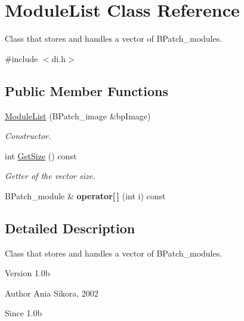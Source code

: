 \hypertarget{class_module_list}{\section{Module\-List Class Reference}
\label{class_module_list}
}


Class that stores and handles a vector of B\-Patch\-\_\-modules.  




{\ttfamily \#include $<$di.\-h$>$}

\subsection*{Public Member Functions}
\begin{DoxyCompactItemize}
\item 
\hyperlink{class_module_list_a184b4e31f6e1df914701a43055215a88}{Module\-List} (B\-Patch\-\_\-image \&bp\-Image)
\begin{DoxyCompactList}\small\item\em Constructor. \end{DoxyCompactList}\item 
int \hyperlink{class_module_list_a30e1ca8e40ebc1ce371fa6925031c6c8}{Get\-Size} () const 
\begin{DoxyCompactList}\small\item\em Getter of the vector size. \end{DoxyCompactList}\item 
\hypertarget{class_module_list_a5c0f811ee4768944e73bc024e0e97588}{B\-Patch\-\_\-module \& {\bfseries operator\mbox{[}$\,$\mbox{]}} (int i) const }\label{class_module_list_a5c0f811ee4768944e73bc024e0e97588}

\end{DoxyCompactItemize}


\subsection{Detailed Description}
Class that stores and handles a vector of B\-Patch\-\_\-modules. 

\begin{DoxyVersion}{Version}
1.\-0b 
\end{DoxyVersion}
\begin{DoxyAuthor}{Author}
Ania Sikora, 2002 
\end{DoxyAuthor}
\begin{DoxySince}{Since}
1.\-0b 
\end{DoxySince}


